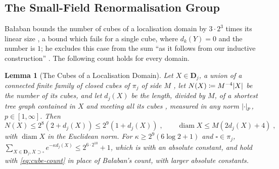 \documentclass[11pt]{preprint}
\newcommand{\diam}{\operatorname{diam}}
\DeclarePairedDelimiter{\abs}{\lvert}{\rvert}
\numberwithin{equation}{section}
\newtheorem{lemma}{Lemma}[section]
\theoremstyle{definition}
\theoremstyle{remark}
\theoremstyle{plain}
\begin{document}
\subsection{The Small-Field Renormalisation Group}

Ba{\l}aban bounds the number of cubes of a localisation domain by $3 \cdot 2^3$ times its linear size \cite[(1.28), p.~8; p.~9, l.~23; (2.30), p.~18]{BalabanRG2}, a bound which fails for a single cube, where $d_k(Y) = 0$ and the number is $1$; he excludes this case from the sum \cite[(1.26)]{BalabanRG2} ``as it follows from our inductive construction'' \cite[p.~8, l.~8]{BalabanRG2}. The following count holds for every domain.

\begin{lemma}[The Cubes of a Localisation Domain]\label{lem:cube-count}
Let $X \in \mathbf D_j$, a union of a connected finite family of closed cubes of $\pi_j$ of side $M$ \cite[p.~257, ll.~2--11]{BalabanRG1}, let $N(X) \coloneqq M^{-4}\abs X$ be the number of its cubes, and let $d_j(X)$ be the length, divided by $M$, of a shortest tree graph contained in $X$ and meeting all its cubes \cite[p.~257, ll.~14--16]{BalabanRG1}, measured in any norm $\abs\cdot_p$, $p \in [1, \infty]$. Then
\begin{equation}\label{eq:cube-count}
    N(X) \leq 2^8(2 + d_j(X)) \leq 2^9(1 + d_j(X))\;,
    \qquad
    \diam X \leq M(2d_j(X) + 4)\;,
\end{equation}
with $\diam X$ in the Euclidean norm. For $\kappa \geq 2^9(6\log2 + 1)$ and $\square \in \pi_j$, $\sum_{X \in \mathbf D_j, X \supset \square}e^{-\kappa d_j(X)} \leq 2^{6\cdot2^{10}} + 1$, which is \cite[(1.26)]{BalabanRG2} with an absolute constant, and \cite[Lemmata~1--3, (2.41)]{BalabanRG2} hold with \eqref{eq:cube-count} in place of Ba{\l}aban's count, with larger absolute constants.
\end{lemma}
\end{document}
